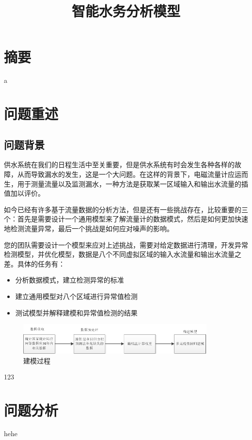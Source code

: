 \documentclass{article}
\begin{document}
	\title{\vspace{+10pt} \heiti \textbf {智能水务分析模型}}
	\songti
	\author{}
	\date{}
	\maketitle  
	\section*{\centering \textbf{摘要}}
		a
		\newpage
	\section{问题重述}
		\subsection{问题背景}
		\par 供水系统在我们的日程生活中至关重要，但是供水系统有时会发生各种各样的故障，从而导致漏水的发生，这是一个大问题。在这样的背景下，电磁流量计应运而生，用于测量流量以及监测漏水，一种方法是获取某一区域输入和输出水流量的插值加以评价。 \cite{kaldor1957model}
		\par 如今已经有许多基于流量数据的分析方法，但是还有一些挑战存在，比较重要的三个：首先是需要设计一个通用模型来了解流量计的数据模式，然后是如何更加快速地检测流量异常，最后一个挑战是如何应对噪声的影响。
		\par 您的团队需要设计一个模型来应对上述挑战，需要对给定数据进行清理，开发异常检测模型，并优化模型，数据是八个不同虚拟区域的输入水流量和输出水流量之差。具体的任务有：

		\begin{itemize}
			\item 分析数据模式，建立检测异常的标准
			\item 建立通用模型对八个区域进行异常值检测
			\item 测试模型并解释建模和异常值检测的结果
		\end{itemize}

		\begin{figure}[htb]
			\centering
			\includegraphics[width=10cm]{pictures/jmgc.png}
			\caption{建模过程}
			\label{jmgc}
		\end{figure}	
		123
	\section{问题分析}	
		hehe
\end{document}
